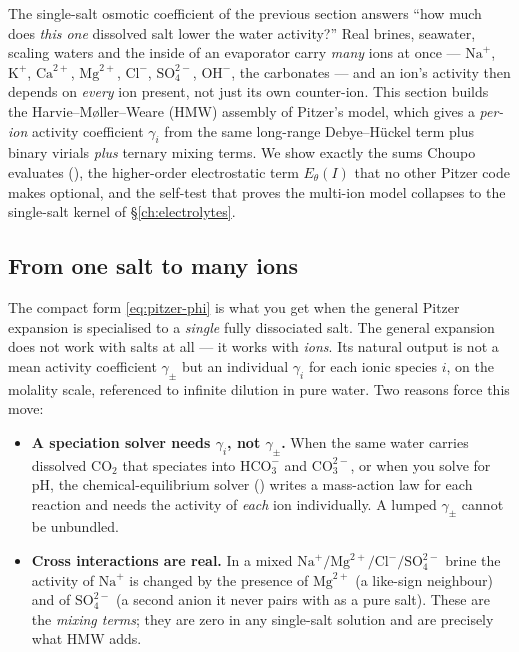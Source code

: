 \documentclass[11pt,a4paper]{article}
\begin{document}
\begin{whatyoulllearn}
The single-salt osmotic coefficient of the previous section answers ``how
much does \emph{this one} dissolved salt lower the water activity?'' Real
brines, seawater, scaling waters and the inside of an evaporator carry
\emph{many} ions at once --- $\text{Na}^+$, $\text{K}^+$, $\text{Ca}^{2+}$,
$\text{Mg}^{2+}$, $\text{Cl}^-$, $\text{SO}_4^{2-}$, $\text{OH}^-$, the
carbonates --- and an ion's activity then depends on \emph{every} ion
present, not just its own counter-ion.  This section builds the
Harvie--M\o ller--Weare (HMW) assembly of Pitzer's model, which gives a
\emph{per-ion} activity coefficient $\gamma_i$ from the same long-range
Debye--H\"uckel term plus binary virials \emph{plus} ternary mixing terms.
We show exactly the sums Choupo evaluates (),
the higher-order electrostatic term $E_\theta(I)$ that no other Pitzer
code makes optional, and the self-test that proves the multi-ion model
collapses to the single-salt kernel of \S\ref{ch:electrolytes}.
\end{whatyoulllearn}

\subsection{From one salt to many ions}

The compact form \eqref{eq:pitzer-phi} is what you get when the general
Pitzer expansion is specialised to a \emph{single} fully dissociated
salt.  The general expansion does not work with salts at all --- it works
with \emph{ions}.  Its natural output is not a mean activity
coefficient $\gamma_\pm$ but an individual $\gamma_i$ for each ionic
species $i$, on the molality scale, referenced to infinite dilution in
pure water.  Two reasons force this move:

\begin{itemize}[leftmargin=*,nosep,topsep=2pt]
  \item \textbf{A speciation solver needs $\gamma_i$, not $\gamma_\pm$.}
        When the same water carries dissolved $\text{CO}_2$ that
        speciates into $\text{HCO}_3^-$ and $\text{CO}_3^{2-}$, or when
        you solve for pH, the chemical-equilibrium solver
        () writes a mass-action law for each
        reaction and needs the activity of \emph{each} ion individually.
        A lumped $\gamma_\pm$ cannot be unbundled.
  \item \textbf{Cross interactions are real.}  In a mixed
        $\text{Na}^+/\text{Mg}^{2+}/\text{Cl}^-/\text{SO}_4^{2-}$ brine
        the activity of $\text{Na}^+$ is changed by the presence of
        $\text{Mg}^{2+}$ (a like-sign neighbour) and of $\text{SO}_4^{2-}$
        (a second anion it never pairs with as a pure salt).  These are
        the \emph{mixing terms}; they are zero in any single-salt
        solution and are precisely what HMW adds.
\end{itemize}
\end{document}
